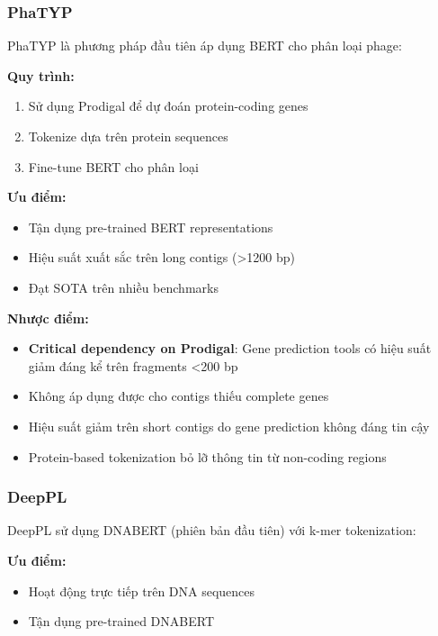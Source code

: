 \subsubsection{PhaTYP}

PhaTYP \cite{shang2023phatyp} là phương pháp đầu tiên áp dụng BERT cho phân loại phage:

\textbf{Quy trình:}
\begin{enumerate}
    \item Sử dụng Prodigal để dự đoán protein-coding genes
    \item Tokenize dựa trên protein sequences
    \item Fine-tune BERT cho phân loại
\end{enumerate}

\textbf{Ưu điểm:}
\begin{itemize}
    \item Tận dụng pre-trained BERT representations
    \item Hiệu suất xuất sắc trên long contigs (>1200 bp)
    \item Đạt SOTA trên nhiều benchmarks
\end{itemize}

\textbf{Nhược điểm:}
\begin{itemize}
    \item \textbf{Critical dependency on Prodigal}: Gene prediction tools có hiệu suất giảm đáng kể trên fragments <200 bp \cite{trimble2012short}
    \item Không áp dụng được cho contigs thiếu complete genes
    \item Hiệu suất giảm trên short contigs do gene prediction không đáng tin cậy
    \item Protein-based tokenization bỏ lỡ thông tin từ non-coding regions
\end{itemize}

\subsubsection{DeepPL}

DeepPL \cite{zhang2024deeppl} sử dụng DNABERT (phiên bản đầu tiên) với k-mer tokenization:

\textbf{Ưu điểm:}
\begin{itemize}
    \item Hoạt động trực tiếp trên DNA sequences
    \item Tận dụng pre-trained DNABERT
\end{itemize}


